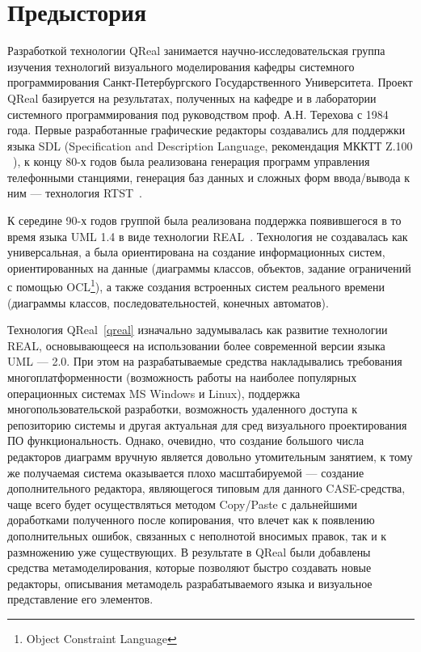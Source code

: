 \documentclass[a4paper]{article}
\begin{document}
\section{Предыстория}

Разработкой технологии QReal занимается научно-исследовательская группа изучения технологий визуального моделирования кафедры системного программирования Санкт-Петербургского Государственного Университета. Проект QReal базируется на результатах, полученных на кафедре и в лаборатории системного программирования под руководством проф. А.Н. Терехова с 1984 года. Первые разработанные графические редакторы создавались для поддержки языка SDL (Specification and Description Language, рекомендация МККТТ Z.100 ~\cite{sdl}), к концу 80-х годов была реализована генерация программ управления телефонными станциями, генерация баз данных и сложных форм ввода/вывода к ним — технология RTST~\cite{rtst}. 

К середине 90-х годов группой была реализована поддержка появившегося в то время языка UML 1.4 в виде технологии REAL~\cite{real}. Технология не создавалась как универсальная, а была ориентирована на создание информационных систем, ориентированных на данные (диаграммы классов, объектов, задание ограничений с помощью OCL\footnote{Object Constraint Language}), а также создания встроенных систем реального времени (диаграммы классов, последовательностей, конечных автоматов). 

Технология QReal~\ref{qreal}  изначально задумывалась как развитие технологии REAL, основывающееся на использовании более современной версии языка UML --- 2.0. При этом на разрабатываемые средства накладывались требования многоплатформенности (возможность работы на наиболее популярных операционных системах MS Windows и Linux), поддержка многопользовательской разработки, возможность удаленного доступа к репозиторию системы и другая актуальная для сред визуального проектирования ПО функциональность. Однако, очевидно, что создание большого числа редакторов диаграмм вручную является довольно утомительным занятием, к тому же получаемая система оказывается плохо масштабируемой --- создание дополнительного редактора, являющегося типовым для данного CASE-средства, чаще всего будет осуществляться методом Copy/Paste с дальнейшими доработками полученного после копирования, что влечет как к появлению дополнительных ошибок, связанных с неполнотой вносимых правок, так и к размножению уже существующих. В результате в QReal были добавлены средства метамоделирования, которые позволяют быстро создавать новые редакторы, описывания метамодель разрабатываемого языка и визуальное представление его элементов.
\end{document}

